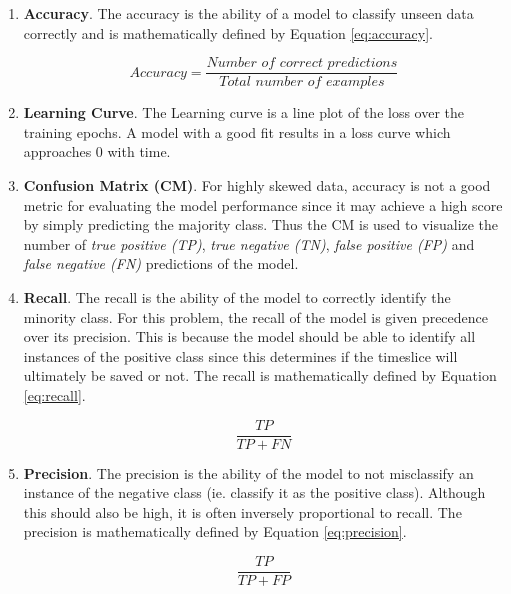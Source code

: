 \begin{enumerate}
\item \textbf{Accuracy}. The accuracy is the ability of a model to
  classify unseen data correctly and is mathematically defined by
  Equation \ref{eq:accuracy}.

  \begin{equation}
    Accuracy = \frac{\textit{Number of correct predictions}}{\textit{Total number of examples}}
    \label{eq:accuracy}
  \end{equation}
  
\item \textbf{Learning Curve}. The Learning curve is a line plot of
  the loss over the training epochs. A model with a good fit results
  in a loss curve which approaches 0 with time.
  
\item \textbf{Confusion Matrix (CM)}. For highly skewed data, accuracy
  is not a good metric for evaluating the model performance
  \cite{branco2015survey} since it may achieve a high score by simply
  predicting the majority class. Thus the CM is used to visualize the
  number of \emph {true positive (TP)}, \emph{true negative (TN)},
  \emph{false positive (FP)} and \emph{false negative (FN)}
  predictions of the model.
\item \textbf{Recall}. The recall is the ability of the model to
  correctly identify the minority class. For this problem, the recall
  of the model is given precedence over its precision. This is because
  the model should be able to identify all instances of the positive
  class since this determines if the timeslice will ultimately be
  saved or not. The recall is mathematically defined by Equation
  \ref{eq:recall}.

  \begin{equation}
    \frac{TP}{TP + FN}
    \label{eq:recall}
  \end{equation}

\item \textbf{Precision}. The precision is the ability of the model to
  not misclassify an instance of the negative class (ie. classify it
  as the positive class). Although this should also be high, it is
  often inversely proportional to recall. The precision is
  mathematically defined by Equation \ref{eq:precision}.

  \begin{equation}
    \frac{TP}{TP + FP}
    \label{eq:precision}
  \end{equation}


\end{enumerate}
